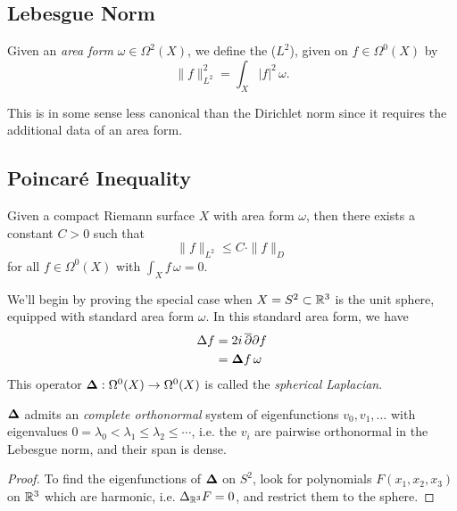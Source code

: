 \documentclass{lkx_paper}
\begin{document}
\subsection{Lebesgue Norm}

\begin{definition}
	Given an \emph{area form} $\omega\in\Omega^2(X)$, we define the  ($L^2$), given on $f\in \Omega^0(X)$ by
	\[
		\|f\|^2_{L^2} = \int_X |f|^2\,\omega.
	\]
\end{definition}

This is in some sense less canonical than the Dirichlet norm since it requires the additional data of an area form.

\subsection{Poincar\'e Inequality}

\begin{theorem}
	Given a compact Riemann surface $X$ with area form $\omega$, then there exists a constant $C>0$ such that
	\[
		\|f\|_{L^2} \leq C\cdot \|f\|_D
	\]
	for all $f\in \Omega^0(X)$ with $\int_X f\,\omega = 0$.
\end{theorem}

We'll begin by proving the special case when $X=S^2\subset \mathbb{R}^3$ is the unit sphere, equipped with standard area form $\omega$. In this standard area form, we have
\[
	\begin{aligned}
		\Delta f & = 2i\,\overline{\partial}\partial f       \\
		         & = \bm{\Delta} f\, \omega
	\end{aligned}
\]
This operator $\bm{\Delta} :\Omega^0(X) \to \Omega^0(X)$ is called the \emph{spherical Laplacian}.

\begin{lemma}
	$\bm{\Delta}$ admits an \emph{complete orthonormal} system of eigenfunctions $v_0, v_1,\ldots$ with eigenvalues $0=\lambda_0 < \lambda_1\leq \lambda_2\leq \cdots$, i.e. the $v_i$ are pairwise orthonormal in the Lebesgue norm, and their span is dense.
\end{lemma}

\begin{proof}
	To find the eigenfunctions of $\bm{\Delta}$ on $S^2$, look for polynomials $F(x_1, x_2, x_3)$ on $\mathbb{R}^3$ which are harmonic, i.e. $\Delta_{\mathbb{R}^3} F = 0$, and restrict them to the sphere.
\end{proof}
\end{document}
